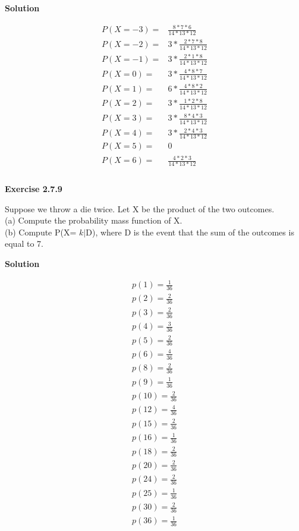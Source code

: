 \documentclass{article}
\begin{document}
\textbf{Solution}

\begin{align}
    P(X=-3)=&\frac{8*7*6}{14*13*12}\\
    P(X=-2)=&3* \frac{2*7*8}{14*13*12}\\
    P(X=-1)=&3* \frac{2*1*8}{14*13*12}\\
    P(X=0)=&3* \frac{4*8*7}{14*13*12}\\
    P(X=1)=&6* \frac{4*8*2}{14*13*12}\\
    P(X=2)=&3* \frac{1*2*8}{14*13*12}\\
    P(X=3)=&3* \frac{8*4*3}{14*13*12}\\
    P(X=4)=&3* \frac{2*4*3}{14*13*12}\\
    P(X=5)=&0\\
    P(X=6)=&\frac{4*2*3}{14*13*12}\\
\end{align}
\\

\pagebreak
\textbf{Exercise 2.7.9}

Suppose we throw a die twice. Let X be the product of the two
outcomes.
\\
(a) Compute the probability mass function of X.\\
(b) Compute P(X= $k\vert$D), where D is the event that the sum of the outcomes is
equal to 7.

\textbf{Solution}

\begin{align}
    p(1)=\frac{1}{36}\\
    p(2)=\frac{2}{36}\\
    p(3)=\frac{2}{36}\\
    p(4)=\frac{3}{36}\\
    p(5)=\frac{2}{36}\\
    p(6)=\frac{4}{36}\\
    p(8)=\frac{2}{36}\\
    p(9)=\frac{1}{36}\\
    p(10)=\frac{2}{36}\\
    p(12)=\frac{4}{36}\\
    p(15)=\frac{2}{36}\\
    p(16)=\frac{1}{36}\\
    p(18)=\frac{2}{36}\\
    p(20)=\frac{2}{36}\\
    p(24)=\frac{2}{36}\\
    p(25)=\frac{1}{36}\\
    p(30)=\frac{2}{36}\\
    p(36)=\frac{1}{36}\\
\end{align}
\end{document}

